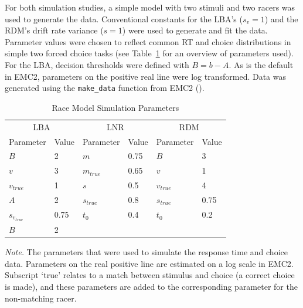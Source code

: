 \documentclass[
  stu,
  floatsintext,
  longtable,
  nolmodern,
  notxfonts,
  notimes,
  draftfirst,
  colorlinks=true,linkcolor=blue,citecolor=blue,urlcolor=blue]{apa7}
\begin{document}
For both simulation studies, a simple model with two stimuli and two
racers was used to generate the data. Conventional constants for the
LBA's (\(s_v = 1\)) and the RDM's drift rate variance (\(s = 1\)) were
used to generate and fit the data. Parameter values were chosen to
reflect common RT and choice distributions in simple two forced choice
tasks (see Table~\ref{tbl-pars} for an overview of parameters used). For
the LBA, decision thresholds were defined with \(B = b - A\). As is the
default in EMC2, parameters on the positive real line were log
transformed. Data was generated using the \texttt{make\_data} function
from EMC2 ().

\begin{table}

{\caption{{Race Model Simulation Parameters}{\label{tbl-pars}}}}

\begin{tabular}[t]{llllll}
\toprule
\multicolumn{2}{c}{LBA} & \multicolumn{2}{c}{LNR} & \multicolumn{2}{c}{RDM} \\
\cmidrule(l{3pt}r{3pt}){1-2} \cmidrule(l{3pt}r{3pt}){3-4} \cmidrule(l{3pt}r{3pt}){5-6}
\multicolumn{1}{c}{Parameter} & \multicolumn{1}{c}{Value} & \multicolumn{1}{c}{Parameter} & \multicolumn{1}{c}{Value} & \multicolumn{1}{c}{Parameter} & \multicolumn{1}{c}{Value} \\
\cmidrule(l{3pt}r{3pt}){1-1} \cmidrule(l{3pt}r{3pt}){2-2} \cmidrule(l{3pt}r{3pt}){3-3} \cmidrule(l{3pt}r{3pt}){4-4} \cmidrule(l{3pt}r{3pt}){5-5} \cmidrule(l{3pt}r{3pt}){6-6}
$B$ & 2 & $m$ & 0.75 & $B$ & 3\\
$v$ & 3 & $m_{true}$ & 0.65 & $v$ & 1\\
$v_{true}$ & 1 & $s$ & 0.5 & $v_{true}$ & 4\\
$A$ & 2 & $s_{true}$ & 0.8 & $s_{true}$ & 0.75\\
$s_{v_{true}}$ & 0.75 & $t_0$ & 0.4 & $t_0$ & 0.2\\
\addlinespace
$B$ & 2 &  &  &  & \\
\bottomrule
\end{tabular}

{\noindent \emph{Note.} The parameters that were used to simulate the
response time and choice data. Parameters on the real positive line are
estimated on a log scale in EMC2. Subscript `true' relates to a match
between stimulus and choice (a correct choice is made), and these
parameters are added to the corresponding parameter for the non-matching
racer.}

\end{table}
\end{document}
